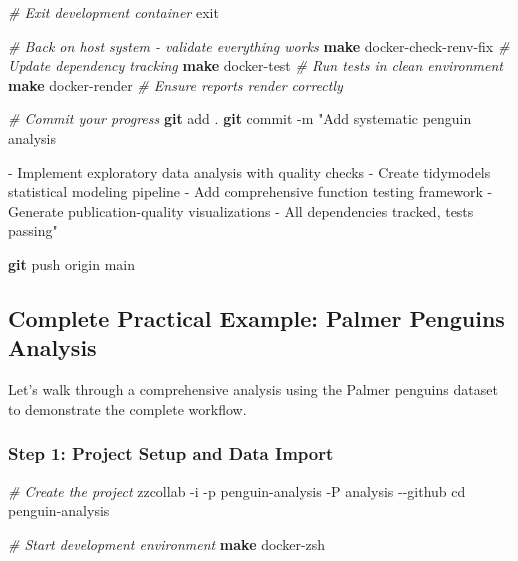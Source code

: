 \documentclass[
]{article}
\newenvironment{Shaded}{\begin{snugshade}}{\end{snugshade}}
\newcommand{\AttributeTok}[1]{\textcolor[rgb]{0.13,0.29,0.53}{#1}}
\newcommand{\BuiltInTok}[1]{#1}
\newcommand{\CommentTok}[1]{\textcolor[rgb]{0.56,0.35,0.01}{\textit{#1}}}
\newcommand{\ExtensionTok}[1]{#1}
\newcommand{\FunctionTok}[1]{\textcolor[rgb]{0.13,0.29,0.53}{\textbf{#1}}}
\newcommand{\NormalTok}[1]{#1}
\newcommand{\StringTok}[1]{\textcolor[rgb]{0.31,0.60,0.02}{#1}}
\begin{document}
\begin{Shaded}
\begin{Highlighting}[]
\CommentTok{\# Exit development container}
\BuiltInTok{exit}

\CommentTok{\# Back on host system {-} validate everything works}
\FunctionTok{make}\NormalTok{ docker{-}check{-}renv{-}fix    }\CommentTok{\# Update dependency tracking}
\FunctionTok{make}\NormalTok{ docker{-}test             }\CommentTok{\# Run tests in clean environment}
\FunctionTok{make}\NormalTok{ docker{-}render           }\CommentTok{\# Ensure reports render correctly}

\CommentTok{\# Commit your progress}
\FunctionTok{git}\NormalTok{ add .}
\FunctionTok{git}\NormalTok{ commit }\AttributeTok{{-}m} \StringTok{"Add systematic penguin analysis}

\StringTok{{-} Implement exploratory data analysis with quality checks}
\StringTok{{-} Create tidymodels statistical modeling pipeline}
\StringTok{{-} Add comprehensive function testing framework}
\StringTok{{-} Generate publication{-}quality visualizations}
\StringTok{{-} All dependencies tracked, tests passing"}

\FunctionTok{git}\NormalTok{ push origin main}
\end{Highlighting}
\end{Shaded}

\subsection{Complete Practical Example: Palmer Penguins
Analysis}\label{complete-practical-example-palmer-penguins-analysis}

Let's walk through a comprehensive analysis using the Palmer penguins
dataset to demonstrate the complete workflow.

\subsubsection{Step 1: Project Setup and Data
Import}\label{step-1-project-setup-and-data-import}

\begin{Shaded}
\begin{Highlighting}[]
\CommentTok{\# Create the project}
\ExtensionTok{zzcollab} \AttributeTok{{-}i} \AttributeTok{{-}p}\NormalTok{ penguin{-}analysis }\AttributeTok{{-}P}\NormalTok{ analysis }\AttributeTok{{-}{-}github}
\BuiltInTok{cd}\NormalTok{ penguin{-}analysis}

\CommentTok{\# Start development environment}
\FunctionTok{make}\NormalTok{ docker{-}zsh}
\end{Highlighting}
\end{Shaded}
\end{document}
